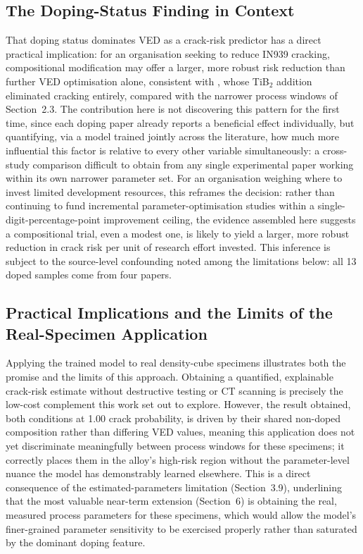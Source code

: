 \documentclass[a4paper]{article}
\begin{document}
\subsection{The Doping-Status Finding in Context}
That doping status dominates VED as a crack-risk predictor has a direct practical implication: for an organisation seeking to reduce IN939 cracking, compositional modification may offer a larger, more robust risk reduction than further VED optimisation alone, consistent with \citet{bae2025}, whose TiB$_2$ addition eliminated cracking entirely, compared with the narrower process windows of Section~2.3. The contribution here is not discovering this pattern for the first time, since each doping paper already reports a beneficial effect individually, but quantifying, via a model trained jointly across the literature, how much more influential this factor is relative to every other variable simultaneously: a cross-study comparison difficult to obtain from any single experimental paper working within its own narrower parameter set. For an organisation weighing where to invest limited development resources, this reframes the decision: rather than continuing to fund incremental parameter-optimisation studies within a single-digit-percentage-point improvement ceiling, the evidence assembled here suggests a compositional trial, even a modest one, is likely to yield a larger, more robust reduction in crack risk per unit of research effort invested. This inference is subject to the source-level confounding noted among the limitations below: all 13 doped samples come from four papers.

\subsection{Practical Implications and the Limits of the Real-Specimen Application}
Applying the trained model to real density-cube specimens illustrates both the promise and the limits of this approach. Obtaining a quantified, explainable crack-risk estimate without destructive testing or CT scanning is precisely the low-cost complement this work set out to explore. However, the result obtained, both conditions at 1.00 crack probability, is driven by their shared non-doped composition rather than differing VED values, meaning this application does not yet discriminate meaningfully between process windows for these specimens; it correctly places them in the alloy's high-risk region without the parameter-level nuance the model has demonstrably learned elsewhere. This is a direct consequence of the estimated-parameters limitation (Section~3.9), underlining that the most valuable near-term extension (Section~6) is obtaining the real, measured process parameters for these specimens, which would allow the model's finer-grained parameter sensitivity to be exercised properly rather than saturated by the dominant doping feature.
\end{document}

